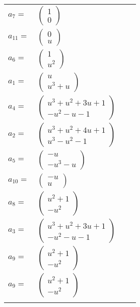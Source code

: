\documentclass[1p]{elsarticle_modified}
\theoremstyle{definition}
\begin{document}
\begin{tabular}{m{7pt} m{180pt} m{7pt} m{180pt} }
\flushright $a_{7}=$&$\begin{pmatrix}1\\0\end{pmatrix}$ \\
\flushright $a_{11}=$&$\begin{pmatrix}0\\u\end{pmatrix}$ \\
\flushright $a_{6}=$&$\begin{pmatrix}1\\u^2\end{pmatrix}$ \\
\flushright $a_{1}=$&$\begin{pmatrix}u\\u^3+u\end{pmatrix}$ \\
\flushright $a_{4}=$&$\begin{pmatrix}u^3+u^2+3 u+1\\- u^2- u-1\end{pmatrix}$ \\
\flushright $a_{2}=$&$\begin{pmatrix}u^3+u^2+4 u+1\\u^3- u^2-1\end{pmatrix}$ \\
\flushright $a_{5}=$&$\begin{pmatrix}- u\\- u^3- u\end{pmatrix}$ \\
\flushright $a_{10}=$&$\begin{pmatrix}- u\\u\end{pmatrix}$ \\
\flushright $a_{8}=$&$\begin{pmatrix}u^2+1\\- u^2\end{pmatrix}$ \\
\flushright $a_{3}=$&$\begin{pmatrix}u^3+u^2+3 u+1\\- u^2- u-1\end{pmatrix}$ \\
\flushright $a_{9}=$&$\begin{pmatrix}u^2+1\\- u^2\end{pmatrix}$\\ \flushright $a_{9}=$&$\begin{pmatrix}u^2+1\\- u^2\end{pmatrix}$\\&\end{tabular}
\end{document}

